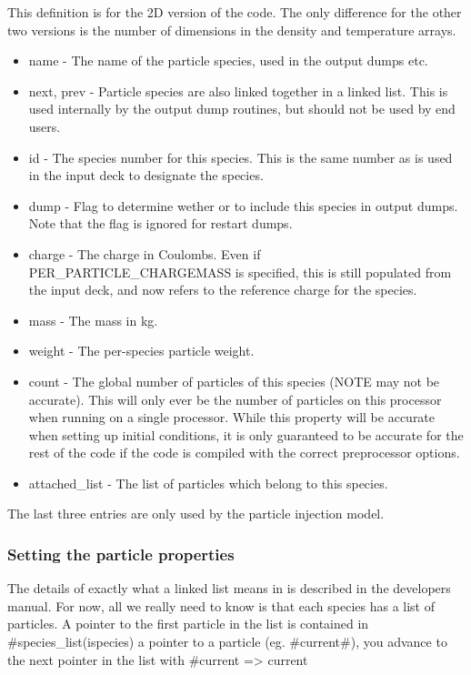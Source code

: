 This definition is for the 2D version of the code. The only difference for
the other two versions is the number of dimensions in the density and
temperature arrays.

\begin{itemize}
\item name - The name of the particle species, used in the output dumps etc.
\item next, prev - Particle species are also linked together in a linked
  list. This is used internally by the output dump routines, but should not be
  used by end users.
\item id - The species number for this species. This is the same number as is
  used in the input deck to designate the species.
\item dump - Flag to determine wether or to include this species in output
  dumps. Note that the flag is ignored for restart dumps.
\item charge - The charge in Coulombs. Even if PER\_PARTICLE\_CHARGEMASS is
  specified, this is still populated from the input deck, and now refers to
  the reference charge for the species.
\item mass - The mass in kg.
\item weight - The per-species particle weight.
\item count - The global number of particles of this species (NOTE may not
  be accurate). This will only ever be the number of particles on this
  processor when running on a single processor. While this property will be
  accurate when setting up initial conditions, it is only guaranteed to be
  accurate for the rest of the code if the code is compiled with the correct
  preprocessor options.
\item attached\_list - The list of particles which belong to this species.
\end{itemize}

The last three entries are only used by the particle injection model.

\subsubsection{Setting the particle properties}
The details of exactly what a linked list means in {\EPOCH} is described
in the developers manual. For now, all we really need to know is that each
species has a list of particles. A pointer to the first particle in the list
is contained in #species_list(ispecies)%
a pointer to a particle (eg. #current#), you advance to the next pointer in
the list with #current => current%

